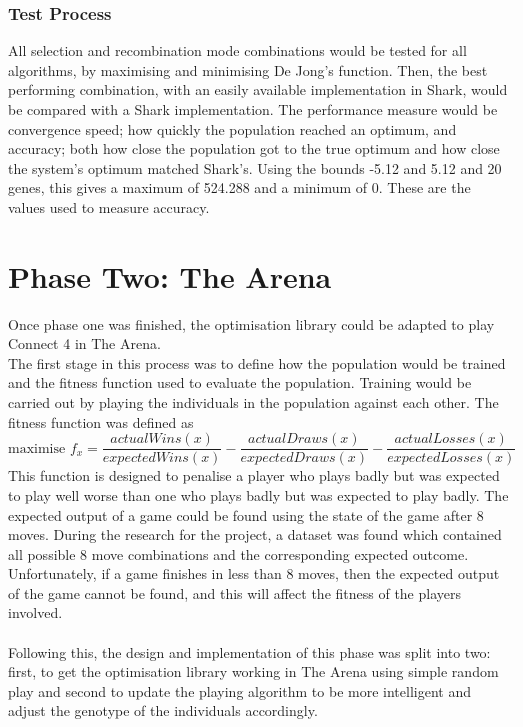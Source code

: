 \subsubsection{Test Process}
All selection and recombination mode combinations would be tested for all algorithms, by maximising and minimising De Jong's function. Then, the best performing combination, with an easily available implementation in Shark, would be compared with a Shark implementation. The performance measure would be convergence speed; how quickly the population reached an optimum, and accuracy; both how close the population got to the true optimum and how close the system's optimum matched Shark's. Using the bounds -5.12 and 5.12 and 20 genes, this gives a maximum of 524.288 and a minimum of 0. These are the values used to measure accuracy.

\section{Phase Two: The Arena}
Once phase one was finished, the optimisation library could be adapted to play Connect 4 in The Arena.
\\The first stage in this process was to define how the population would be trained and the fitness function used to evaluate the population. Training would be carried out by playing the individuals in the population against each other. The fitness function was defined as
\begin{equation}
  \text{maximise } f_{x} = \frac{actualWins(x)}{expectedWins(x)} - \frac{actualDraws(x)}{expectedDraws(x)} - \frac{actualLosses(x)}{expectedLosses(x)}
\label{eq:connect4}
\end{equation}
This function is designed to penalise a player who plays badly but was expected to play well worse than one who plays badly but was expected to play badly. The expected output of a game could be found using the state of the game after 8 moves. During the research for the project, a dataset was found which contained all possible 8 move combinations and the corresponding expected outcome\cite{uci}. Unfortunately, if a game finishes in less than 8 moves, then the expected output of the game cannot be found, and this will affect the fitness of the players involved.
\\\\Following this, the design and implementation of this phase was split into two: first, to get the optimisation library working in The Arena using simple random play and second to update the playing algorithm to be more intelligent and adjust the genotype of the individuals accordingly.

